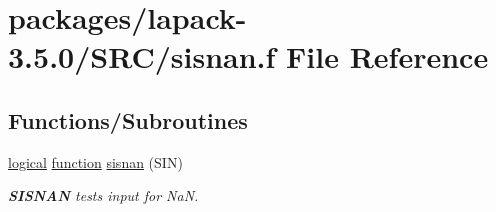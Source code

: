 \hypertarget{sisnan_8f}{}\section{packages/lapack-\/3.5.0/\+S\+R\+C/sisnan.f File Reference}
\label{sisnan_8f}
\subsection*{Functions/\+Subroutines}
\begin{DoxyCompactItemize}
\item 
\hyperlink{tnc_8c_aa7b64cdf39500931f7b333343791a104}{logical} \hyperlink{afunc_8m_a7b5e596df91eadea6c537c0825e894a7}{function} \hyperlink{group__auxOTHERauxiliary_gaeca6bb0411af000e3c883ee744184991}{sisnan} (S\+I\+N)
\begin{DoxyCompactList}\small\item\em {\bfseries S\+I\+S\+N\+A\+N} tests input for Na\+N. \end{DoxyCompactList}\end{DoxyCompactItemize}

